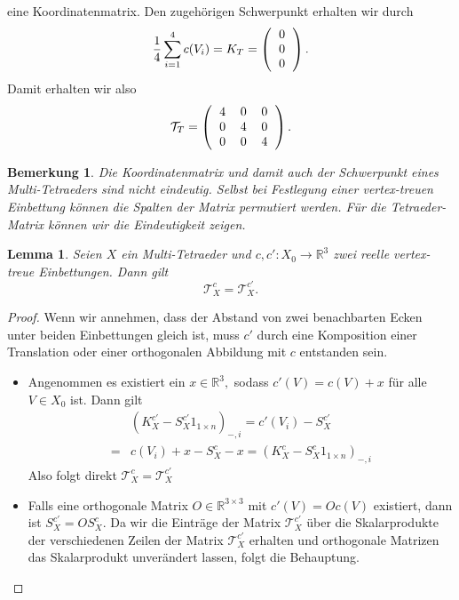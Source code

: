 \documentclass[12pt,titlepage,twoside,cleardoublepage]{article}
\theoremstyle{nummermitklammern}
\newtheorem{lemma}[temp]{Lemma}
\newtheorem{bemerkung}[temp]{Bemerkung}
\newtheorem{lemma}[zahl]{Lemma}
\newtheorem{bemerkung}[zahl]{Bemerkung}
\numberwithin{equation}{section}
\begin{document}
eine Koordinatenmatrix.
Den zugehörigen Schwerpunkt erhalten wir durch 
\[
\frac{1}{4}\sum_{i=1}^4c(V_i)=
K_T=\left(\begin{tabular}{c}
0\\
0\\
0\\
\end{tabular}\right).
\]
Damit erhalten wir also 
\[
\mathcal{T}_T=\left(\begin{tabular}{ccc}
4&0&0\\
0&4&0\\
0&0&4\\
\end{tabular}\right).
\]
\begin{bemerkung}
Die Koordinatenmatrix und damit auch der Schwerpunkt  eines Multi-Tetraeders sind nicht eindeutig. Selbst bei Festlegung einer vertex-treuen Einbettung können die Spalten der Matrix permutiert werden. Für die Tetraeder-Matrix können wir die Eindeutigkeit zeigen.
\end{bemerkung}
\begin{lemma}
Seien $X$ ein Multi-Tetraeder und $c,c':X_0\to \mathbb{R}^3$ zwei reelle vertex-treue Einbettungen. Dann gilt 
\[
\mathcal{T}^c_X=\mathcal{T}_X^{c'}.
\]
\end{lemma}
\begin{proof}
Wenn wir annehmen, dass der Abstand von zwei benachbarten Ecken unter beiden Einbettungen gleich ist, muss $c'$ durch eine Komposition einer Translation oder einer orthogonalen Abbildung mit $c$ entstanden sein. 
\begin{itemize}
\item Angenommen es existiert ein $x\in \mathbb{R}^3,$ sodass $c'(V)=c(V)+x$ für alle $V\in X_0$ ist. Dann gilt 
\begin{align*}
&(K_X^{c'}-S_X^{c'}1_{1\times n})_{-,i}=c'(V_i)-S_X^{c'}\\
=&c(V_i)+x-S_X^c-x=(K_X^{c}-S_X^{c}1_{1\times n})_{-,i}
\end{align*}
Also folgt direkt $\mathcal{T}_X^c=\mathcal{T}_X^{c'}$
\item Falls eine orthogonale Matrix $O\in \mathbb{R}^{3\times 3}$ mit $c'(V)=Oc(V)$ existiert, dann ist $S_X^{c'}=OS_X^c.$ Da wir die Einträge der Matrix $\mathcal{T}_X^{c'}$ über die Skalarprodukte der verschiedenen Zeilen der Matrix $\mathcal{T}_X^{c'}$ erhalten und orthogonale Matrizen das Skalarprodukt unverändert lassen, folgt die Behauptung.
\end{itemize} 
\end{proof}
\end{document}
